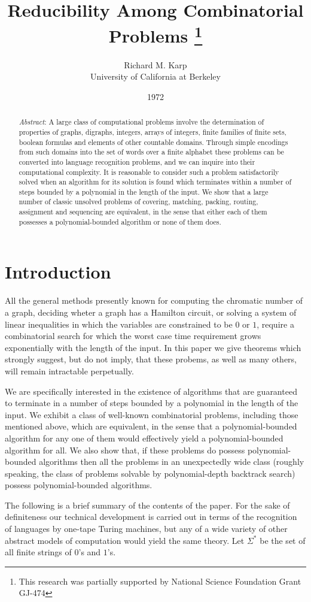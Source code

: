 \documentclass{scrartcl}
\title{Reducibility Among Combinatorial Problems \thanks{This research was partially supported by National Science Foundation Grant GJ-474}}
\author{Richard M. Karp \\ University of California at Berkeley}
\date{1972}
\begin{document}
\maketitle

\begin{abstract}
\emph{Abstract}: A large class of computational problems involve the determination of properties of graphs, digraphs, integers, arrays of integers, finite families of finite sets, boolean formulas and elements of other countable domains.
Through simple encodings from such domains into the set of words over a finite alphabet these problems can be converted into language recognition problems, and we can inquire into their computational complexity.
It is reasonable to consider such a problem satisfactorily solved when an algorithm for its solution is found which terminates within a number of steps bounded by a polynomial in the length of the input.
We show that a large number of classic unsolved problems of covering, matching, packing, routing, assignment and sequencing are equivalent, in the sense that either each of them possesses a polynomial-bounded algorithm or none of them does.
\end{abstract}

\section{Introduction}
All the general methods presently known for computing the chromatic number of a graph, deciding wheter a graph has a Hamilton circuit, or solving a system of linear inequalities in which the variables are constrained to be \(0\) or \(1\), require a combinatorial search for which the worst case time requirement grows exponentially with the length of the input.
In this paper we give theorems which strongly suggest, but do not imply, that these probems, as well as many others, will remain intractable perpetually.

We are specifically interested in the existence of algorithms that are guaranteed to terminate in a number of steps bounded by a polynomial in the length of the input.
We exhibit a class of well-known combinatorial problems, including those mentioned above, which are equivalent, in the sense that a polynomial-bounded algorithm for any one of them would effectively yield a polynomial-bounded algorithm for all.
We also show that, if these problems do possess polynomial-bounded algorithms then all the problems in an unexpectedly  wide class (roughly speaking, the class of problems solvable by polynomial-depth backtrack search) possess polynomial-bounded algorithms.

The following is a brief summary of the contents of the paper.
For the sake of definiteness our technical development is carried out in terms of the recognition of languages by one-tape Turing machines, but any of a wide variety of other abstract models of computation would yield the same theory.
Let \(\Sigma^{*}\) be the set of all finite strings of \(0\)'s and \(1\)'s.
\end{document}
